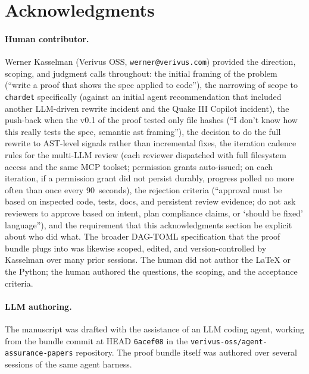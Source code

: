 \documentclass[11pt,letterpaper]{article}
\begin{document}
\section*{Acknowledgments}

\paragraph{Human contributor.}
Werner Kasselman (Verivus OSS, \texttt{werner@verivus.com})
provided the direction, scoping, and judgment calls throughout:
the initial framing of the problem (``write a proof that shows the
spec applied to code''), the narrowing of scope to \texttt{chardet}
specifically (against an initial agent recommendation that included
another LLM-driven rewrite incident and the Quake III Copilot
incident), the
push-back when the v0.1 of the proof tested only file hashes
(``I don't know how this really tests the spec, semantic ast
framing''), the decision to do the full rewrite to AST-level
signals rather than incremental fixes, the iteration cadence rules
for the multi-LLM review (each reviewer dispatched with full
filesystem access and the same MCP toolset; permission grants
auto-issued; on each iteration, if a permission grant did not
persist durably, progress polled no more often than once every
90~seconds), the rejection criteria (``approval must be based on
inspected code, tests, docs, and persistent review evidence; do
not ask reviewers to approve based on intent, plan compliance
claims, or `should be fixed' language''), and the requirement that
this acknowledgments section be explicit about who did what. The
broader DAG-TOML specification that the proof bundle plugs into
was likewise scoped, edited, and version-controlled by Kasselman
over many prior sessions. The human did not author the LaTeX or
the Python; the human authored the questions, the scoping, and
the acceptance criteria.

\paragraph{LLM authoring.}
The manuscript was drafted with the assistance of an LLM coding
agent, working from the bundle commit at HEAD \texttt{6acef08} in
the \texttt{verivus-oss/agent-assurance-papers} repository. The
proof bundle itself was authored over several sessions of the same
agent harness.
\end{document}
